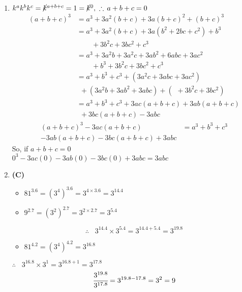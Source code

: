 \begin{multicols}{2}
\begin{enumerate}[label={\arabic*.}]
    \item $k^ak^bk^c = \cancel{k}^{a + b + c} = 1 = \cancel{k}^0,\,\, \therefore\, a + b + c = 0$
    \begin{align*} 
        (a+b+c)^3 &= a^3 + 3a^2(b+c) + 3a(b+c)^2 + (b+c)^3 \\
        & = a^3 + 3a^2(b+c) + 3a(b^2 + 2bc + c^2) + b^3 \\
        &\hspace{25pt}+ 3b^2c + 3bc^2 + c^3 \\
        & = a^3 + 3a^2b + 3a^2c + 3ab^2 + 6abc + 3ac^2 \\
        &\hspace{25pt} + b^3 + 3b^2c + 3bc^2 + c^3 \\
        & = a^3 + b^3 + c^3 + (3a^2c + 3abc + 3ac^2) \\
        & \hspace{5pt} + (3a^2b + 3ab^2 + 3abc ) + ( \boxed{\hspace{5pt}} + 3b^2c + 3bc^2) \\
        & = a^3 + b^3 + c^3 + 3ac(a + b + c)+3ab(a + b + c )\\
        & \hspace{5pt}  + 3bc( a + b + c) -3abc 
    \end{align*} \vspace{-20pt}
    \begin{align*}
    (a+b+c)^3 - 3ac(a + b + c) &= a^3 + b^3 + c^3 \\
    -3ab(a + b + c )- 3bc( a + b + c) +3abc  
    \end{align*}
    So, if $a + b + c = 0$ \\
    $0^3 -3ac(0) -3ab(0) -3bc(0) + 3abc = 3abc$

    \item \textbf{(C)}\begin{itemize} 
        \item $81^{3.6} = (3^4)^{3.6} = 3^{4 \times 3.6} = 3^{14.4}$ 
        \item $9^{2.7} = (3^2)^{2.7} = 3^{2 \times 2.7} = 3^{5.4}$
    \end{itemize}
    $$\therefore \hspace{10pt} 3^{14.4} \times 3^{5.4} = 3^{14.4 + 5.4} = 3^{19.8}$$
    \begin{itemize} 
        \item $81^{4.2} = (3^4)^{4.2} = 3^{16.8}$
    \end{itemize}
    $\therefore \hspace{10pt} 3^{16.8} \times 3^{1} = 3^{16.8+ 1} = 3^{17.8}$ 
    $$\cfrac{3^{19.8}}{3^{17.8}} = 3^{19.8 - 17.8} = 3^2 = 9$$


\end{enumerate}
\end{multicols}
